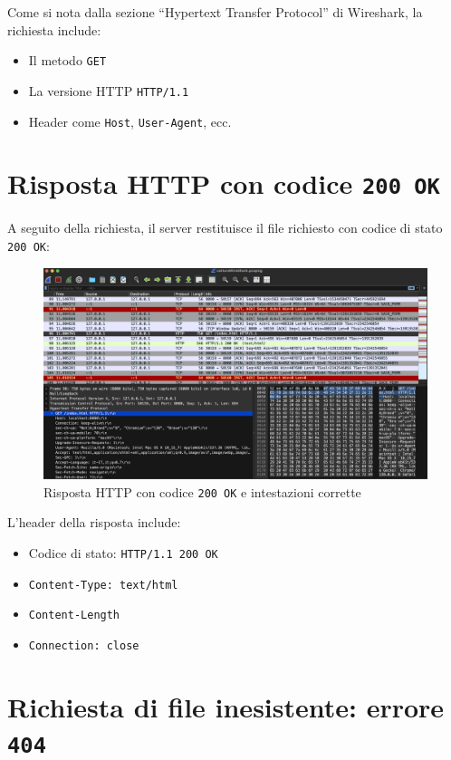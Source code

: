 \documentclass[a4paper,12pt]{report}
\begin{document}
Come si nota dalla sezione “Hypertext Transfer Protocol” di Wireshark, la richiesta include:
\begin{itemize}
    \item Il metodo \texttt{GET}
    \item La versione HTTP \texttt{HTTP/1.1}
    \item Header come \texttt{Host}, \texttt{User-Agent}, ecc.
\end{itemize}

\section{Risposta HTTP con codice \texttt{200 OK}}

A seguito della richiesta, il server restituisce il file richiesto con codice di stato \texttt{200 OK}:

\begin{figure}[H]
    \centering
    \includegraphics[width=1.0\textwidth]{Images/200.png}
    \caption{Risposta HTTP con codice \texttt{200 OK} e intestazioni corrette}
\end{figure}

L’header della risposta include:
\begin{itemize}
    \item Codice di stato: \texttt{HTTP/1.1 200 OK}
    \item \texttt{Content-Type: text/html}
    \item \texttt{Content-Length}
    \item \texttt{Connection: close}
\end{itemize}

\section{Richiesta di file inesistente: errore \texttt{404}}
\end{document}

